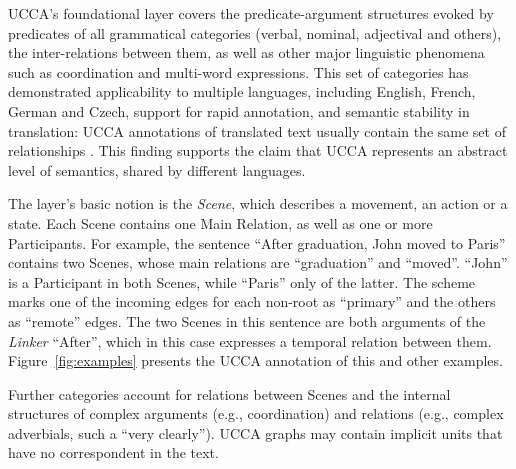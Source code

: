 \documentclass[12pt]{article}
\newcommand{\figref}[1]{Figure~\ref{#1}}
\begin{document}
UCCA's foundational layer covers the predicate-argument
structures evoked by predicates of all grammatical categories
(verbal, nominal, adjectival and others), the inter-relations between them,
as well as other major linguistic phenomena such as coordination and multi-word expressions.
This set of categories has demonstrated applicability to multiple languages, including
English, French, German and Czech, support for rapid annotation, and semantic stability in translation:
UCCA annotations of translated text usually contain the same set of relationships
\cite{sulem2015conceptual}. This finding supports the claim that UCCA represents an abstract
level of semantics, shared by different languages.

The layer's basic notion is the {\it Scene}, which describes a movement, an action or a state.
Each Scene contains one Main Relation, as well as one or more Participants.
For example, the sentence ``After graduation, John moved to Paris'' contains two Scenes,
whose main relations are ``graduation'' and ``moved''. ``John'' is a Participant in both Scenes,
while ``Paris'' only of the latter.
The scheme marks one of the incoming edges for each non-root
as ``primary'' and the others as ``remote'' edges.
The two Scenes in this sentence are both arguments of the \textit{Linker} ``After'',
which in this case expresses a temporal relation between them.
\figref{fig:examples} presents the UCCA annotation of this and other examples.

Further categories account for relations between Scenes and the internal structures of
complex arguments (e.g., coordination) and relations
(e.g., complex adverbials, such a ``very clearly''). UCCA graphs may contain implicit
units that have no correspondent in the text.

\end{document}
